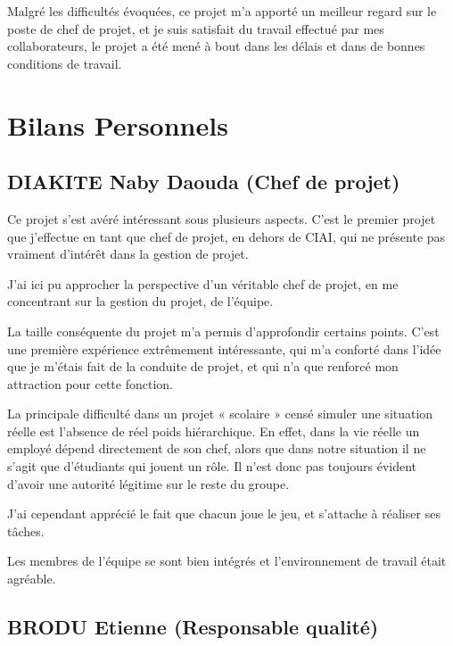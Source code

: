       Malgré les difficultés évoquées, ce projet m'a apporté un meilleur regard sur le poste de chef de projet, et je suis satisfait du travail effectué par mes collaborateurs, le projet a été mené à bout dans les délais et dans de bonnes conditions de travail.


\section{Bilans Personnels}

    \subsection{DIAKITE Naby Daouda (Chef de projet)}

        Ce projet s’est avéré intéressant sous plusieurs aspects. C’est le premier projet que j’effectue en tant que chef de projet, en dehors de CIAI, qui ne présente pas vraiment d’intérêt dans la gestion de projet.

        J’ai ici pu approcher la perspective d’un véritable chef de projet, en me concentrant sur la gestion du projet, de l’équipe. 

        La taille conséquente du projet m’a permis d’approfondir certains points. C’est une première expérience extrêmement intéressante, qui m’a conforté dans l’idée que je m’étais fait de la conduite de projet, et qui n’a que renforcé mon attraction pour cette fonction.

        La principale difficulté dans un projet « scolaire » censé simuler une situation réelle est l’absence de réel poids hiérarchique. En effet, dans la vie réelle un employé dépend directement de son chef,  alors que dans notre situation il ne s’agit que d’étudiants qui jouent un rôle. Il n’est donc pas toujours évident d’avoir une autorité légitime sur le reste du groupe.

        J’ai cependant apprécié le fait que chacun joue le jeu, et s’attache à réaliser ses tâches.

        Les membres de l'équipe se sont bien intégrés et l'environnement de travail était agréable.

    \subsection{BRODU Etienne (Responsable qualité)}

